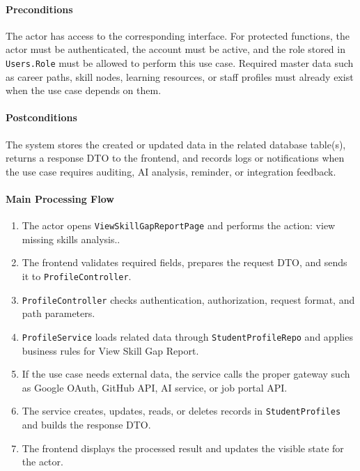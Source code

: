\paragraph{Preconditions}

The actor has access to the corresponding interface. For protected functions, the actor must be authenticated, the account must be active, and the role stored in \texttt{Users.Role} must be allowed to perform this use case. Required master data such as career paths, skill nodes, learning resources, or staff profiles must already exist when the use case depends on them.

\paragraph{Postconditions}

The system stores the created or updated data in the related database table(s), returns a response DTO to the frontend, and records logs or notifications when the use case requires auditing, AI analysis, reminder, or integration feedback.

\paragraph{Main Processing Flow}

\begin{enumerate}
    \item The actor opens \texttt{ViewSkillGapReportPage} and performs the action: view missing skills analysis..
    \item The frontend validates required fields, prepares the request DTO, and sends it to \texttt{ProfileController}.
    \item \texttt{ProfileController} checks authentication, authorization, request format, and path parameters.
    \item \texttt{ProfileService} loads related data through \texttt{StudentProfileRepo} and applies business rules for View Skill Gap Report.
    \item If the use case needs external data, the service calls the proper gateway such as Google OAuth, GitHub API, AI service, or job portal API.
    \item The service creates, updates, reads, or deletes records in \texttt{StudentProfiles} and builds the response DTO.
    \item The frontend displays the processed result and updates the visible state for the actor.
\end{enumerate}

